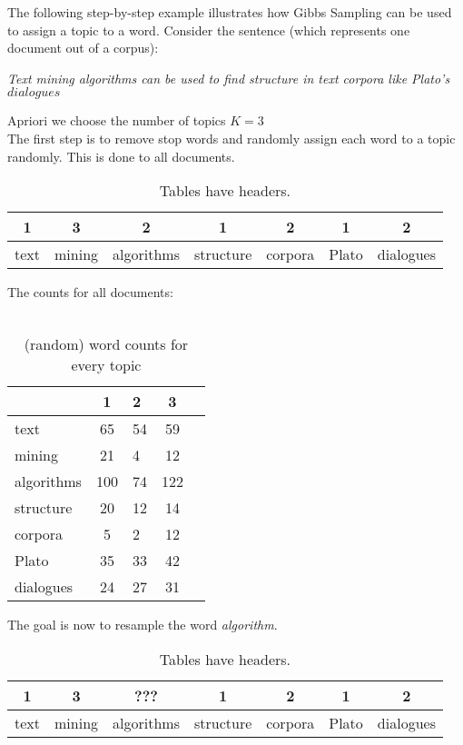 \documentclass[a4paper,ngerman]{atseminar}
\begin{document}
\begin{example}
The following step-by-step example illustrates how Gibbs Sampling can be used to assign a topic to a word.
Consider the sentence (which represents one document out of a corpus):

\vspace{1cm}
\textit{Text mining algorithms can be used to find structure in text corpora like Plato’s $dialogues$}
\vspace{1cm}

Apriori we choose the number of topics $K=3$
\\
The first step is to remove stop words and randomly assign each word to a topic randomly. This is done to all documents.
\\
\begin{table}[h]
\centering
\caption{Tables have headers.}
\begin{tabular}{| c | c | c | c | c | c | c | }
\hline
1 & 3 & 2 & 1 & 2 & 1 & 2 \\
\hline 
text & mining & algorithms & structure & corpora & Plato & dialogues \\
\hline
\end{tabular}
\end{table}

The counts for all documents:
\\ \\
\begin{table}[h]
\centering
\caption{(random) word counts for every topic}
\begin{tabular}{ l | c l c | c  }
& \textbf{1} & \textbf{2} & \textbf{3} \\
\hline 
text & 65 & 54 & 59 \\
mining &  21 & 4 & 12 \\
algorithms & 100 & 74 & 122 \\
structure & 20 & 12 & 14 \\
corpora &  5 & 2 & 12 \\
Plato &  35 & 33 & 42 \\
dialogues &  24 & 27 & 31 \\
\end{tabular}
\end{table}

The goal is now to resample the word \textit{algorithm}.

\begin{table}[h]
\centering
\caption{Tables have headers.}
\begin{tabular}{ | c | c | c | c | c | c | c |}
\hline
1 & 3 & ??? & 1 & 2 & 1 & 2 \\
\hline
text & mining & algorithms & structure & corpora & Plato & dialogues \\
\hline
\end{tabular}
\end{table}


\end{example}
\end{document}
